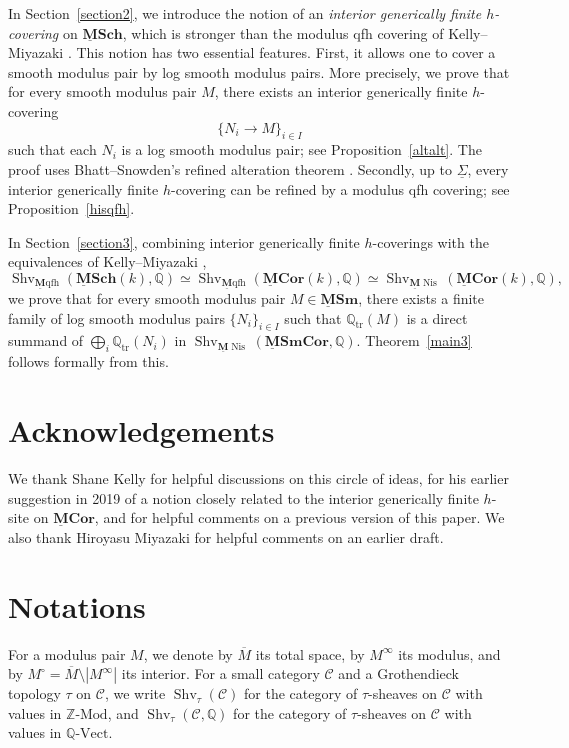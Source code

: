 \documentclass[11pt]{amsart}
\newcommand{\Q}{\mathbb{Q}}
\newcommand{\Z}{\mathbb{Z}}
\newcommand{\sC}{\mathcal{C}}
\newcommand{\Shv}{{\operatorname{Shv}}}
\newcommand{\Mqfh}{\ulM \text{qfh}}
\newcommand{\ul}[1]{{\underline{#1}}}
\newcommand{\tr}{{\operatorname{tr}}}
\newcommand{\Nis}{{\operatorname{Nis}}}
\newcommand{\ol}{\overline}
\newcommand{\M}{\mathbf{M}}
\newcommand{\ulM}{\underline{\M}}
\newcommand{\ulMCor}{\operatorname{\mathbf{\underline{M}Cor}}}
\newcommand{\ulMSm}{\operatorname{\mathbf{\underline{M}Sm}}}
\newcommand{\ulMSCH}{\operatorname{\mathbf{\underline{M}Sch}}}
\newcommand{\ulMSmCor}{\operatorname{\mathbf{\underline{M}SmCor}}}
\theoremstyle{definition}
\theoremstyle{remark}
\numberwithin{equation}{section}
\begin{document}
In Section~\ref{section2}, we introduce the notion of an \textit{interior generically finite $h$-covering} on $\ulMSCH$, which is stronger than the modulus qfh covering of Kelly--Miyazaki \cite[Definition 4.5]{KM21}. This notion has two essential features. First, it allows one to cover a smooth modulus pair by log smooth modulus pairs. More precisely, we prove that for every smooth modulus pair $M$, there exists an interior generically finite $h$-covering
\[
\{N_i\to M \}_{i \in I}
\]
such that each $N_i$ is a log smooth modulus pair; see Proposition~\ref{altalt}. The proof uses Bhatt--Snowden's refined alteration theorem \cite{BS17}. Secondly, up to $\ul{\Sigma}$, every interior generically finite $h$-covering can be refined by a modulus qfh covering; see Proposition~\ref{hisqfh}.

In Section~\ref{section3}, combining interior generically finite $h$-coverings with the equivalences of Kelly--Miyazaki \cite[Theorems 6.9 and 6.10]{KM21},
\begin{equation}\label{intro3}
\Shv_{\Mqfh}(\ulMSCH(k),\Q) \simeq \Shv_{\Mqfh}(\ulMCor(k),\Q) \simeq \Shv_{\ulM \Nis}(\ulMCor(k),\Q),
\end{equation}
we prove that for every smooth modulus pair $M \in \ulMSm$, there exists a finite family of log smooth modulus pairs $\{N_i\}_{i \in I}$ such that $\Q_\tr(M)$ is a direct summand of $\bigoplus_i \Q_\tr(N_i)$ in $\Shv_{\ulM\Nis}(\ulMSmCor,\Q)$. Theorem~\ref{main3} follows formally from this.

\section*{Acknowledgements}
We thank Shane Kelly for helpful discussions on this circle of ideas, for his earlier suggestion in 2019 of a notion closely related to the interior generically finite $h$-site on $\ulMCor$, and for helpful comments on a previous version of this paper. We also thank Hiroyasu Miyazaki for helpful comments on an earlier draft.

\section*{Notations}

For a modulus pair $M$, we denote by $\ol{M}$ its total space, by $M^\infty$ its modulus, and by $M^\circ=\ol{M} \setminus |M^\infty|$ its interior. For a small category $\sC$ and a Grothendieck topology $\tau$ on $\sC$, we write $\Shv_{\tau}(\sC)$ for the category of $\tau$-sheaves on $\sC$ with values in $\Z\text{-Mod}$, and $\Shv_{\tau}(\sC,\Q)$ for the category of $\tau$-sheaves on $\sC$ with values in $\Q\text{-Vect}$.
\end{document}
